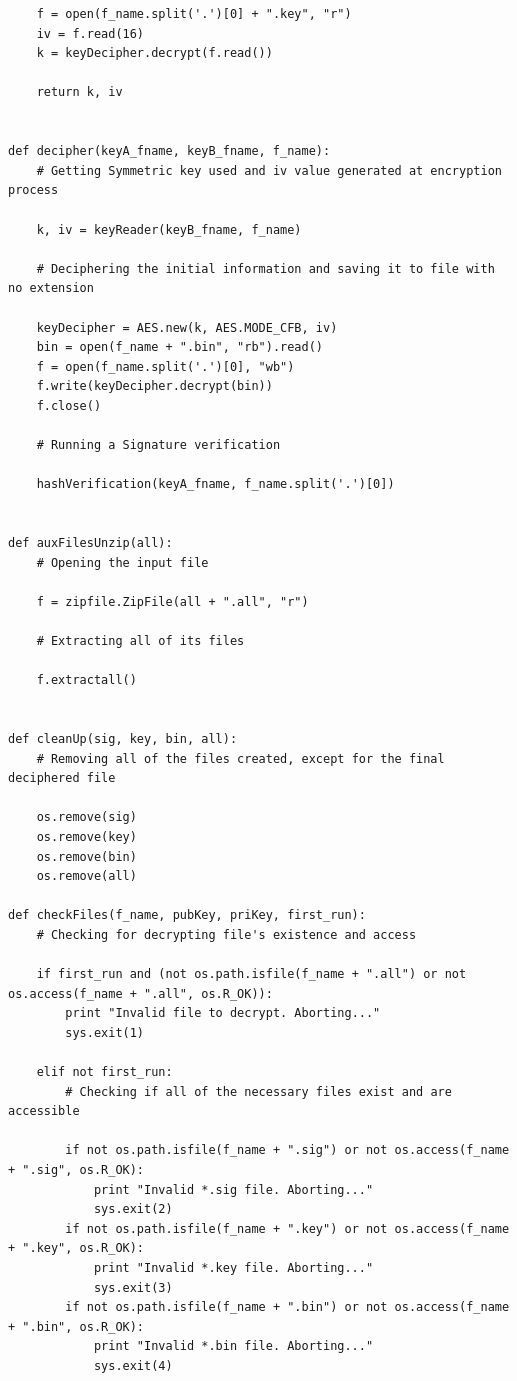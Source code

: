 \documentclass[a4paper,11pt,openright,oneside]{report}
\begin{document}
\begin{appendices}
\begin{verbatim}
    f = open(f_name.split('.')[0] + ".key", "r")
    iv = f.read(16)
    k = keyDecipher.decrypt(f.read())

    return k, iv


def decipher(keyA_fname, keyB_fname, f_name):
    # Getting Symmetric key used and iv value generated at encryption process

    k, iv = keyReader(keyB_fname, f_name)

    # Deciphering the initial information and saving it to file with no extension

    keyDecipher = AES.new(k, AES.MODE_CFB, iv)
    bin = open(f_name + ".bin", "rb").read()
    f = open(f_name.split('.')[0], "wb")
    f.write(keyDecipher.decrypt(bin))
    f.close()

    # Running a Signature verification

    hashVerification(keyA_fname, f_name.split('.')[0])


def auxFilesUnzip(all):
    # Opening the input file

    f = zipfile.ZipFile(all + ".all", "r")

    # Extracting all of its files

    f.extractall()


def cleanUp(sig, key, bin, all):
    # Removing all of the files created, except for the final deciphered file

    os.remove(sig)
    os.remove(key)
    os.remove(bin)
    os.remove(all)

def checkFiles(f_name, pubKey, priKey, first_run):
    # Checking for decrypting file's existence and access

    if first_run and (not os.path.isfile(f_name + ".all") or not os.access(f_name + ".all", os.R_OK)):
        print "Invalid file to decrypt. Aborting..."
        sys.exit(1)

    elif not first_run:
        # Checking if all of the necessary files exist and are accessible

        if not os.path.isfile(f_name + ".sig") or not os.access(f_name + ".sig", os.R_OK):
            print "Invalid *.sig file. Aborting..."
            sys.exit(2)
        if not os.path.isfile(f_name + ".key") or not os.access(f_name + ".key", os.R_OK):
            print "Invalid *.key file. Aborting..."
            sys.exit(3)
        if not os.path.isfile(f_name + ".bin") or not os.access(f_name + ".bin", os.R_OK):
            print "Invalid *.bin file. Aborting..."
            sys.exit(4)


\end{verbatim}
\end{appendices}
\end{document}
